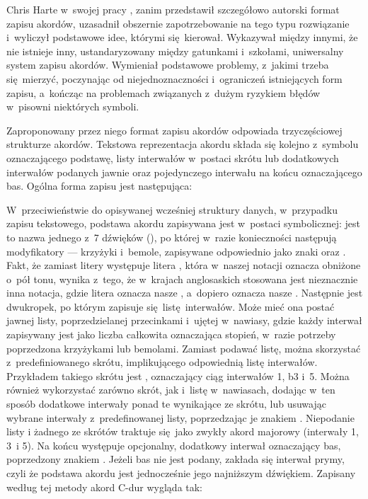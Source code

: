 Chris Harte w~swojej pracy \cite{harte_towards_nodate}, zanim przedstawił szczegółowo autorski format zapisu akordów, uzasadnił obszernie zapotrzebowanie na tego typu rozwiązanie i~wyliczył podstawowe idee, którymi się kierował. Wykazywał między innymi, że nie istnieje inny, ustandaryzowany między gatunkami i~szkołami, uniwersalny system zapisu akordów.  Wymieniał podstawowe problemy, z~jakimi trzeba się mierzyć, poczynając od niejednoznaczności i~ograniczeń istniejących form zapisu, a~kończąc na problemach związanych z~dużym ryzykiem błędów w~pisowni niektórych symboli.

Zaproponowany przez niego format zapisu akordów odpowiada trzyczęściowej strukturze akordów.  Tekstowa reprezentacja akordu składa się kolejno z~symbolu oznaczającego podstawę, listy interwałów w~postaci skrótu lub dodatkowych interwałów podanych jawnie oraz pojedynczego interwału na końcu oznaczającego bas. Ogólna forma zapisu jest następująca: 
\begin{center}
\end{center}
W~przeciwieństwie do opisywanej wcześniej struktury danych, w~przypadku zapisu tekstowego, podstawa akordu zapisywana jest w~postaci symbolicznej: jest to nazwa jednego z~7 dźwięków (), po której w~razie konieczności następują modyfikatory --- krzyżyki i~bemole, zapisywane odpowiednio jako znaki \code{\#} oraz . Fakt, że zamiast litery  występuje litera , która w~naszej notacji oznacza  obniżone o~pół tonu, wynika z~tego, że w~krajach anglosaskich stosowana jest nieznacznie inna notacja, gdzie litera  oznacza nasze , a~dopiero  oznacza nasze . Następnie jest dwukropek, po którym zapisuje się listę interwałów. Może mieć ona postać jawnej listy, poprzedzielanej przecinkami i~ujętej w~nawiasy, gdzie każdy interwał zapisywany jest jako liczba całkowita oznaczająca stopień, w~razie potrzeby poprzedzona krzyżykami lub bemolami. Zamiast podawać listę, można skorzystać z~predefiniowanego skrótu, implikującego odpowiednią listę interwałów. Przykładem takiego skrótu jest , oznaczający ciąg interwałów 1, b3 i~5. Można również wykorzystać zarówno skrót, jak i~listę w~nawiasach, dodając w~ten sposób dodatkowe interwały ponad te wynikające ze skrótu, lub usuwając wybrane interwały z~predefinowanej listy, poprzedzając je znakiem \code{*}. Niepodanie listy i żadnego ze skrótów traktuje się jako zwykły akord majorowy (interwały 1, 3~i 5). Na końcu występuje opcjonalny, dodatkowy interwał oznaczający bas, poprzedzony znakiem \code{/}. Jeżeli bas nie jest podany, zakłada się interwał prymy, czyli że podstawa akordu jest jednocześnie jego najniższym dźwiękiem. Zapisany według tej metody akord C-dur wygląda tak:
